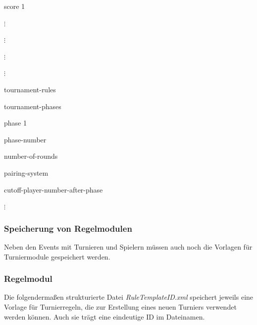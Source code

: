 \documentclass[11pt]{article}
\newcommand{\umlbullet}[1] {
	\raisebox{0.5ex}{
	\begin{tikzpicture}[#1]
		\draw (1ex,0.4ex) -- (1ex,1.3ex);
		\draw (1ex,0.4ex) -- (2ex,0.4ex);
	\end{tikzpicture}}
}
\begin{document}
{{\begin{umlscheme}
\begin{umlscheme}
\begin{umlscheme}
\begin{umlscheme}
\begin{umlscheme}
\begin{umlscheme}
						\vspace{0.1cm}
						\item[] \hspace{0.4cm} \umlbullet{} score 1
						\item[] \hspace{0.6cm} $\vdots$
						\item[] $\vdots$
					\end{umlscheme}
				\end{umlscheme}
				\item[] $\vdots$
			\end{umlscheme}
		\end{umlscheme}
		\item[] $\vdots$
	\end{umlscheme}
	\item tournament-rules
	\begin{umlscheme}
		\item tournament-phases
		\begin{umlscheme}
			\item phase 1
			\begin{umlscheme}
				\item phase-number
				\item number-of-rounds
				\item pairing-system
				\item cutoff-player-number-after-phase
			\end{umlscheme}
			\item[] $\vdots$
		\end{umlscheme}
	\end{umlscheme}
\end{umlscheme}}}

\subsubsection{Speicherung von Regelmodulen}

Neben den Events mit Turnieren und Spielern müssen auch noch die Vorlagen für Turniermodule gespeichert werden.

\subsubsection{Regelmodul}

Die folgendermaßen strukturierte Datei \textit{RuleTemplateID.xml} speichert jeweils eine Vorlage für Turnierregeln, die zur Erstellung eines neuen Turniers verwendet werden können. Auch sie trägt eine eindeutige ID im Dateinamen.
\vspace{0.4cm}
\end{document}
